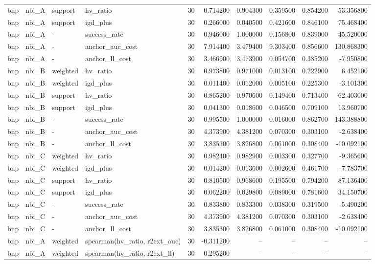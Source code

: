 \begin{landscape}
\begin{longtable}{llllrrrrrr}
bnp & nbi\_A & support & hv\_ratio & 30 & 0.714200 & 0.904300 & 0.359500 & 0.854200 & 53.356800 \\
bnp & nbi\_A & support & igd\_plus & 30 & 0.266000 & 0.040500 & 0.421600 & 0.846100 & 75.468400 \\
bnp & nbi\_A & - & success\_rate & 30 & 0.946000 & 1.000000 & 0.156800 & 0.839000 & 45.520000 \\
bnp & nbi\_A & - & anchor\_auc\_cost & 30 & 7.914400 & 3.479400 & 9.303400 & 0.856600 & 130.868300 \\
bnp & nbi\_A & - & anchor\_ll\_cost & 30 & 3.466900 & 3.473900 & 0.054700 & 0.385200 & -7.950800 \\
bnp & nbi\_B & weighted & hv\_ratio & 30 & 0.973800 & 0.971000 & 0.013100 & 0.222900 & 6.452100 \\
bnp & nbi\_B & weighted & igd\_plus & 30 & 0.011400 & 0.012000 & 0.005100 & 0.225300 & -3.101300 \\
bnp & nbi\_B & support & hv\_ratio & 30 & 0.865200 & 0.970600 & 0.149400 & 0.713400 & 62.403000 \\
bnp & nbi\_B & support & igd\_plus & 30 & 0.041300 & 0.018600 & 0.046500 & 0.709100 & 13.960700 \\
bnp & nbi\_B & - & success\_rate & 30 & 0.995500 & 1.000000 & 0.016000 & 0.862700 & 143.388800 \\
bnp & nbi\_B & - & anchor\_auc\_cost & 30 & 4.373900 & 4.381200 & 0.070300 & 0.303100 & -2.638400 \\
bnp & nbi\_B & - & anchor\_ll\_cost & 30 & 3.835300 & 3.826800 & 0.061000 & 0.308400 & -10.092100 \\
bnp & nbi\_C & weighted & hv\_ratio & 30 & 0.982400 & 0.982900 & 0.003300 & 0.327700 & -9.365600 \\
bnp & nbi\_C & weighted & igd\_plus & 30 & 0.014200 & 0.013600 & 0.002600 & 0.461700 & -7.783700 \\
bnp & nbi\_C & support & hv\_ratio & 30 & 0.810500 & 0.968600 & 0.195500 & 0.794200 & 87.136400 \\
bnp & nbi\_C & support & igd\_plus & 30 & 0.062200 & 0.029800 & 0.089000 & 0.781600 & 34.150700 \\
bnp & nbi\_C & - & success\_rate & 30 & 0.833800 & 0.833300 & 0.038300 & 0.319500 & -5.490200 \\
bnp & nbi\_C & - & anchor\_auc\_cost & 30 & 4.373900 & 4.381200 & 0.070300 & 0.303100 & -2.638400 \\
bnp & nbi\_C & - & anchor\_ll\_cost & 30 & 3.835300 & 3.826800 & 0.061000 & 0.308400 & -10.092100 \\
bnp & nbi\_A & weighted & spearman(hv\_ratio, r2ext\_auc) & 30 & -0.311200 & -- & -- & -- & -- \\
bnp & nbi\_A & weighted & spearman(hv\_ratio, r2ext\_ll) & 30 & 0.295200 & -- & -- & -- & -- \\
\end{longtable}\endgroup\addtocounter{table}{-1}

\end{landscape}
